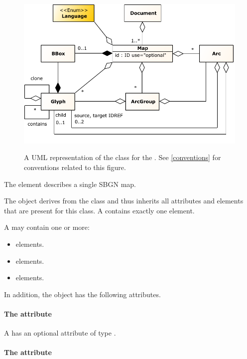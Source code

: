 \begin{figure}[ht!]
  \centering
  \includegraphics[scale=1.0]{figures/sbgnml_map_uml.pdf}\\
\caption{A UML representation of the \Map class for the \SbgnmlPackage.
See \ref{conventions} for conventions related to this figure. }
  \label{fig:sbgnml_map_uml}
\end{figure}


The  element describes a single SBGN map.

The \Map object derives from the \SbgnBase class and thus inherits all
attributes and elements that are present for this class.
A \Map contains exactly one \BBox element.

A \Map may contain one or more:

\begin{itemize}
  \item \Glyph elements.
  \item \Arc elements.
  \item \ArcGroup elements.
\end{itemize}

In addition, the \Map object has the following attributes.

\paragraph{The \fixttspace{} attribute}

A \Map has an optional attribute  of type .


\paragraph{The \fixttspace{} attribute}

